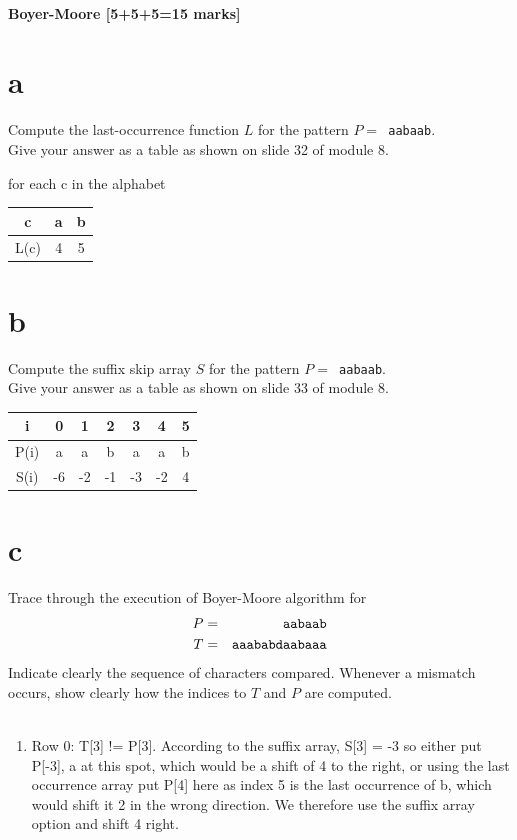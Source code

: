 \documentclass[12pt]{article}
\begin{document}
\subsection{Boyer-Moore [5+5+5=15 marks]}
\begin{itemize}
\part{a}
Compute the last-occurrence function $L$ for the pattern $P =$\texttt{~aabaab}.\\ Give your answer as a table as shown on slide 32 of module 8.

for each c in the alphabet\\

\begin{tabular}{c|c|c|}
  \hline
  c & a & b\\
  \hline
  L(c) & 4 & 5\\
  \hline
\end{tabular}

\part{b}
Compute the suffix skip array $S$ for the pattern $P =$\texttt{~aabaab}. \\Give your answer as a table as shown on slide 33 of module 8.

\begin{tabular}{c|c|c|c|c|c|c|}
  \hline
  i & 0 & 1 & 2 & 3 & 4 & 5\\
  \hline
  P(i) & a & a & b & a & a & b\\
  \hline
  S(i) & -6 & -2 & -1 & -3 & -2 & 4\\
  \hline

\end{tabular}

\part{c} Trace through the execution of Boyer-Moore algorithm for 
\begin{align*}
P &=& \tt{aabaab}\\
T &=& \tt{aaababdaabaaa}
\end{align*}
Indicate clearly the sequence of characters compared. Whenever a mismatch occurs, show clearly how the indices to $T$ and $P$ are computed.\\\\

\begin{enumerate}
\item Row 0: T[3] != P[3]. According to the suffix array, S[3] = -3 so either put P[-3], a at this spot, which would be a shift of 4 to the right, or using the last occurrence array put P[4] here as index 5 is the last occurrence of b, which would shift it 2 in the wrong direction. We therefore use the suffix array option and shift 4 right.


\end{enumerate}
\end{itemize}
\end{document}
